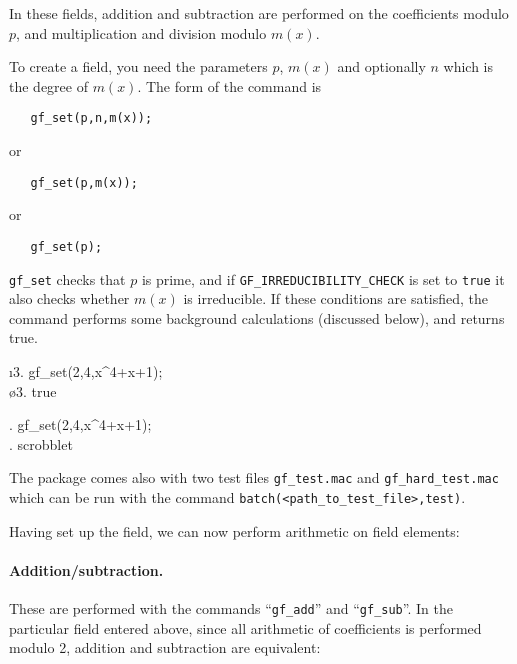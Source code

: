 \documentclass[a4paper,11pt,leqno,fleqn]{artikel3}
\newcommand{\D}{\displaystyle}
\begin{document}
In these fields, addition and subtraction are performed on the coefficients
modulo $p$, and multiplication and division modulo $m(x)$.

To create a field, you need the parameters $p$, $m(x)$
and optionally $n$ which is the degree of $m(x)$.  The form of
the command is

\begin{Verbatim}
   gf_set(p,n,m(x));
\end{Verbatim}
\noindent or
\begin{Verbatim}
   gf_set(p,m(x));
\end{Verbatim}
\noindent or
\begin{Verbatim}
   gf_set(p);
\end{Verbatim}

\verb!gf_set! checks that $p$ is prime, and 
if \texttt{GF\_IRREDUCIBILITY\_CHECK} is set to \texttt{true}
it also checks whether $m(x)$ is irreducible. If
these conditions are satisfied, the command performs some background
calculations (discussed below), and returns true.

\begin{maximasession}
  \maximaoutput*
  \i3. gf_set(2,4,x^4+x+1);\\
  \o3. true\\
\end{maximasession}

\begin{maximasession}
\maximatexsession
{}. gf_set(2,4,x^4+x+1);\\
\D1. scrobblet\\
\end{maximasession}


The package comes also with two test files \texttt{gf\_test.mac}
and \texttt{gf\_hard\_test.mac} which can be run with the
command
\texttt{batch(<path\_to\_test\_file>,test)}.

\bigskip

Having set up the field, we can now perform arithmetic on field elements:

\paragraph{Addition/subtraction.}

These are performed with the commands ``\verb!gf_add!'' and ``\verb!gf_sub!''.
In the particular field entered above, since all arithmetic of coefficients is
performed modulo 2, addition and subtraction are equivalent:
\end{document}
